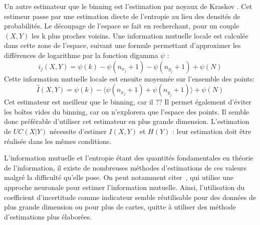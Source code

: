 Un autre estimateur que le binning est l'estimation par noyaux de Kraskov \cite{2004kraskov}. Cet estimeur passe par une estimation diecte de l'entropie au lieu des densités de probabilités. Le découpage de l'espace se fait en recherchant, pour un couple $(X,Y)$ les k plus proches voisins. Une information mutuelle locale est calculée dans cette zone de l'espace, suivant une formule permettant d'approximer les différences de logarithme par la fonction digamma $\psi$ : 
$$i_j(X,Y) = \psi(k) - \psi(n_{x_j} + 1) - \psi(n_{y_j} +1) + \psi(N)$$
Cette information mutuelle locale est ensuite moyennée sur l'ensemble des points: 
$$\hat{I}(X,Y) = \psi(k) - \langle\psi(n_{x_j} + 1) + \psi(n_{y_j} +1)\rangle + \psi(N)$$
Cet estimateur est meilleur que le binning, car il ?? 
Il permet également d'éviter les boîtes vides du binning, car on n'explorera que l'espace des points. Il semble donc préférable d'utiliser cet estimateur en plus grande dimension.
L'estimation de $UC(X|Y)$ nécessite d'estimer $I(X,Y)$ et $H(Y)$ : leur estimation doit être réalisée dans les mêmes conditions.

L'information mutuelle et l'entropie étant des quantités fondamentales en théorie de l'information, il existe de nombreuses méthodes d'estimations de ces valeurs malgré la difficulté qu'elle pose. On peut notamment citer~\cite{Belghazi2018MutualIN}, qui utilise une approche neuronale pour estimer l'information mutuelle. Ainsi, l'utilisation du coefficient d'incertitude comme indicateur semble réutilisable pour des données de plus grande dimension ou pour plus de cartes, quitte à utiliser des méthode d'estimations plus élaborées. 

